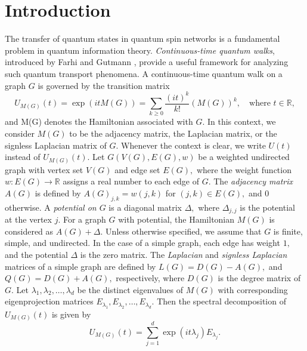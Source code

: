 \documentclass[12pt,a4paper]{article}
\begin{document}
\section{Introduction} 
The transfer of quantum states in quantum spin networks is a fundamental problem in quantum information theory. 
\emph{Continuous-time quantum walks}, introduced by Farhi and Gutmann \cite{farhi}, provide a useful framework for analyzing such quantum transport phenomena.
A continuous-time quantum walk on a graph $G$ is governed  by the transition matrix 
\[U_{M(G)}(t)=\exp{(itM(G))}=\sum_{k\geq 0}\frac{(it)^k}{k!}(M(G))^k,\quad \text{where $t\in\mathbb{R}, $}\]
and M(G) denotes the Hamiltonian associated with $G.$ In this context, we consider $M(G)$ to be the adjacency matrix, the Laplacian matrix, or the signless Laplacian matrix of $G.$ Whenever the context is clear, we write 
$U(t)$ instead of 
$U_{M(G)}(t).$ Let $G (V(G), E(G), w)$ be a weighted undirected graph with vertex set $V(G)$ and edge set $E(G),$ where the weight function $w:E(G)\to \mathbb{R}$ assigns a real number to each edge of $G.$ The \textit{adjacency matrix} $A(G)$ is defined by $A(G)_{j,k}=w(j,k)$ for $(j,k)\in E(G),$ and $0$ otherwise. A \textit{potential on $G$} is a diagonal matrix $\Delta,$ where $\Delta_{j,j}$  is the potential at the vertex $j.$ For a graph $G$ with potential, the Hamiltonian $M(G)$ is considered as $A(G)+\Delta.$
Unless otherwise specified, we assume that $G$ is finite, simple, and undirected. In the case of a simple graph, each edge has weight $1,$ and the potential $\Delta$ is the zero matrix. The \textit{Laplacian} and \textit{signless Laplacian} matrices of a simple graph are defined by $L(G)=D(G)-A(G),$ and $Q(G)=D(G)+A(G),$ respectively, where $D(G)$ is the degree matrix of $G.$  Let $\lambda_1,\lambda_2,\ldots,\lambda_d$ be the distinct eigenvalues of $M(G)$ with corresponding eigenprojection matrices $E_{\lambda_1},E_{\lambda_2},\ldots,E_{\lambda_d}.$ Then the spectral decomposition of $U_{M(G)}(t)$ is given by
   \[U_{M(G)}(t)=\sum_{j=1}^{d}\exp{(it\lambda_j)}E_{\lambda_j}.\]
\end{document}

